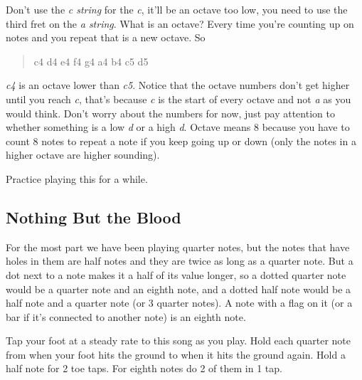\documentclass[12pt]{article}
\begin{document}
Don't use the \emph{c string} for the \emph{c}, it'll be an octave too low, you need to use the third fret on the \emph{a string}. What is an octave? Every time you're counting up on notes and you repeat that is a new octave. So
\begin{quote}
	c4 d4 e4 f4 g4 a4 b4 c5 d5 
\end{quote}
\emph{c4} is an octave lower than \emph{c5}. Notice that the octave numbers don't get higher until you reach \emph{c}, that's because \emph{c} is the start of every octave and not \emph{a} as you would think. Don't worry about the numbers for now, just pay attention to whether something is a low \emph{d} or a high \emph{d}. Octave means 8 because you have to count 8 notes to repeat a note if you keep going up or down (only the notes in a higher octave are higher sounding).

{%
\parindent 0pt
\noindent
\ifx\preLilyPondExample \undefined
\else
  \expandafter\preLilyPondExample
\fi
\def\lilypondbook{}%

\ifx\postLilyPondExample \undefined
\else
  \expandafter\postLilyPondExample
\fi
}

Practice playing this for a while. 

\subsection{Nothing But the Blood}

{%
\parindent 0pt
\noindent
\ifx\preLilyPondExample \undefined
\else
  \expandafter\preLilyPondExample
\fi
\def\lilypondbook{}%

\ifx\postLilyPondExample \undefined
\else
  \expandafter\postLilyPondExample
\fi
}

For the most part we have been playing quarter notes,
but the notes that have holes in them are half notes and they are twice as long as a quarter note. But a dot next to a note makes it a half of its value longer, so a dotted quarter note would be a quarter note and an eighth note, and a dotted half note would be a half note and a quarter note (or 3 quarter notes). A note with a flag on it (or a bar if it's connected to another note) is an eighth note.

{%
\parindent 0pt
\noindent
\ifx\preLilyPondExample \undefined
\else
  \expandafter\preLilyPondExample
\fi
\def\lilypondbook{}%

\ifx\postLilyPondExample \undefined
\else
  \expandafter\postLilyPondExample
\fi
}

Tap your foot at a steady rate to this song as you play. Hold each quarter note from when your foot hits the ground to when it hits the ground again. Hold a half note for 2 toe taps. For eighth notes do 2 of them in 1 tap.
\end{document}
